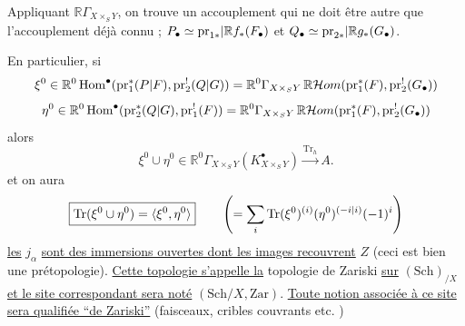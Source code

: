 Appliquant $\mathbb{R}\Gamma_{X\times_S Y}$, on trouve un accouplement
qui ne doit être autre que l'accouplement déjà connu  ; $P_\bullet\simeq{\mathrm{pr}_{1*}|\mathbb{R}f_*}(F_\bullet)$ et $Q_\bullet\simeq{\mathrm{pr}_{2*}|\mathbb{R}g_*}(G_\bullet)$.

En particulier, si
\[
\xi^0\in\mathbb{R}^0\operatorname{Hom}^{\bullet}(\mathrm{pr}_1^*({P|F}),\mathrm{pr}_2^!({Q|G}))
=\mathbb{R}^0\Gamma_{X\times_S Y}\,\mathbb{R}\mathcal{H}om(\mathrm{pr}_1^*(F),\mathrm{pr}_2^!(G_\bullet))
\]
\[
\eta^0\in\mathbb{R}^0\operatorname{Hom}^{\bullet}(\mathrm{pr}_2^*({Q|G}),\mathrm{pr}_1^!(F))
=\mathbb{R}^0\Gamma_{X\times_S Y}\,\mathbb{R}\mathcal{H}om(\mathrm{pr}_1^*(F),\mathrm{pr}_2^!(G_\bullet))
\]
alors
\[
\xi^0\cup\eta^0\in\mathbb{R}^0\Gamma_{X\times_S Y}(K_{X\times_S Y}^{\bullet})\xrightarrow{\operatorname{Tr}_h} A.
\]
et on aura
\[
\boxed{\operatorname{Tr}(\xi^0\cup\eta^0)=\langle\xi^0,\eta^0\rangle}
\qquad
\left(=\sum_i\operatorname{Tr}(\xi^0)^{(i)}(\eta^0)^{({-i|i})}{(-1)^i}\right)
\]
\uline{les} $j_\alpha$ \uline{sont des immersions ouvertes dont les images recouvrent} $Z$ (ceci est bien une prétopologie). \uline{Cette topologie s'appelle la} topologie de Zariski \uline{sur} $(\mathrm{Sch})_{/X}$ \uline{et le site correspondant sera noté} $(\mathrm{Sch}/X,\mathrm{Zar})$. \uline{Toute notion associée à ce site sera qualifiée ``de Zariski''} (faisceaux, cribles couvrants etc. )

